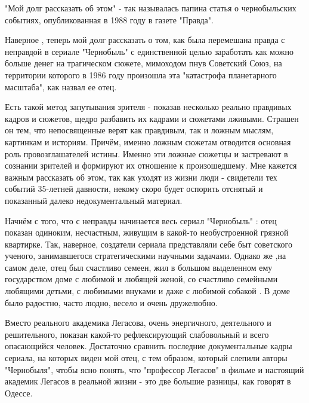 "Мой долг рассказать об этом" - так называлась папина статья о чернобыльских
событиях, опубликованная в 1988 году в газете "Правда". 

Наверное , теперь мой долг рассказать о том, как была перемешана правда с
неправдой в сериале "Чернобыль" с единственной целью заработать как можно
больше денег на трагическом сюжете, мимоходом пнув Советский Союз, на
территории которого в 1986 году произошла эта "катастрофа планетарного
масштаба", как назвал ее отец. 

Есть такой метод запутывания зрителя - показав несколько реально правдивых
кадров и сюжетов, щедро разбавить их кадрами и сюжетами лживыми. Страшен он
тем, что непосвященные верят как правдивым, так и ложным мыслям, картинкам и
историям. Причём, именно ложным сюжетам отводится основная роль
провозглашателей истины. Именно эти ложные сюжетцы и застревают в сознании
зрителей и формируют их отношение к произошедшему. Мне кажется важным
рассказать об этом, так как уходят из жизни люди - свидетели тех событий
35-летней давности, некому скоро будет оспорить отснятый и показанный далеко
недокументальный материал. 

Начнём с того, что с неправды начинается весь сериал "Чернобыль" : отец показан
одиноким, несчастным, живущим в какой-то необустроенной грязной квартирке. Так,
наверное, создатели сериала представляли себе быт советского ученого,
занимавшегося стратегическими научными задачами. Однако же ,на самом деле, отец
был счастливо семеен, жил в большом выделенном ему государством доме с любимой
и любящей женой, со счастливо семейными любящими детьми, с любимыми внуками и
даже с любимой собакой . В доме было радостно, часто людно, весело и очень
дружелюбно. 

Вместо реального академика Легасова, очень энергичного, деятельного и
решительного, показан какой-то рефлексирующий слабовольный и всего опасающийся
человек. Достаточно сравнить последние документальные кадры сериала, на которых
виден мой отец,  с тем образом, который слепили авторы "Чернобыля", чтобы ясно
понять, что "профессор Легасов" в фильме и настоящий академик Легасов в
реальной жизни - это две большие разницы, как говорят в Одессе. 

